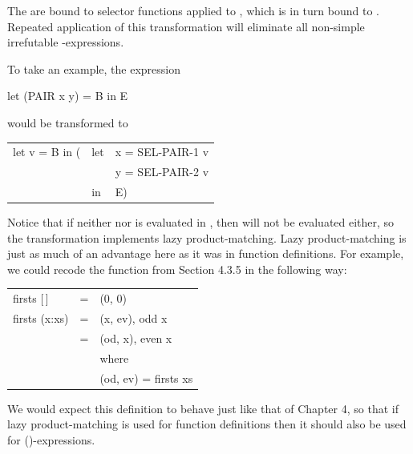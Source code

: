 {

The  are bound to selector functions applied to , which is in turn bound to
. Repeated application of this transformation will eliminate all non-simple
irrefutable -expressions.

To take an example, the expression
\begin{mlcoded}
	let (PAIR x y) = B in E
\end{mlcoded}
would be transformed to
\begin{mlcoded}
	\begin{tabular}{lll}
	let v = B in (&let &x = SEL-PAIR-1 v \\
		& &y = SEL-PAIR-2 v\\
		&in &E)
	\end{tabular}
\end{mlcoded}

Notice that if neither  nor  is evaluated in , then  will not be evaluated
either, so the transformation implements lazy product-matching. Lazy
product-matching is just as much of an advantage here as it was in function
definitions. For example, we could recode the function  from Section
4.3.5 in the following way:
\begin{mlcoded}
	\begin{tabular}{lll}
	firsts [\,] &= &(0, 0)\\
	firsts (x:xs) &= &(x, ev), \qquad odd x\\
	&= &(od, x), \qquad even x\\
	& &where\\
	& &(od, ev) = firsts xs
	\end{tabular}
\end{mlcoded}
We would expect this definition to behave just like that of Chapter 4, so that if
lazy product-matching is used for function definitions then it should also be
used for ()-expressions.

}

